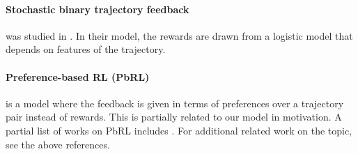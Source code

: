 \paragraph{\bf Stochastic binary trajectory feedback\hspace{-0.5em}} was studied in \citet{chatterji2021theory}. In their model, the  rewards are drawn
from a logistic model that depends on features of the trajectory.


\paragraph{\bf Preference-based RL (PbRL)\hspace{-0.5em}} is a model where the feedback is given in terms of preferences over a trajectory pair instead of rewards. This is partially related to our model in motivation. A partial list of works on PbRL includes \citep{saha2023dueling,chen2022human,wu2023making}. For additional related work on the topic, see the above references.




\begingroup  %
\renewcommand{\thefootnote}{\fnsymbol{footnote}}  %


